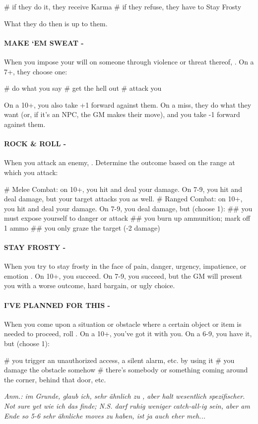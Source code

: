 \begin{easylist}
    # if they do it, they receive Karma
    # if they refuse, they have to Stay Frosty 
\end{easylist}

What they do then is up to them.


\paragraph{MAKE ‘EM SWEAT -} When you impose your will on someone through violence or threat thereof, . On a 7+, they choose one:

\begin{easylist}
    # do what you say
    # get the hell out
    # attack you
\end{easylist}

On a 10+, you also take +1 forward against them. On a miss, they do what they want (or, if it’s an NPC, the GM makes their move), and you take -1 forward against them.


\paragraph{ROCK \& ROLL -} When you attack an enemy, . Determine the outcome based on the range at which you attack:

\begin{easylist}
    # Melee Combat: on 10+, you hit and deal your damage. On 7-9, you hit and deal damage, but your target attacks you as well.
    # Ranged Combat: on 10+, you hit and deal your damage. On 7-9, you deal damage, but (choose 1):
    ## you must expose yourself to danger or attack
    ## you burn up ammunition; mark off 1 ammo
    ## you only graze the target (-2 damage)
\end{easylist}


\paragraph{STAY FROSTY -} When you try to stay frosty in the face of pain, danger, urgency, impatience, or emotion . On 10+, you succeed. On 7-9, you succeed, but the GM will present you with a worse outcome, hard bargain, or ugly choice.


\paragraph{I'VE PLANNED FOR THIS - } When you come upon a situation or obstacle where a certain object or item is needed to proceed, roll . On a 10+, you've got it with you. On a 6-9, you have it, but (choose 1):
\begin{easylist}
    # you trigger an unauthorized access, a silent alarm, etc. by using it
    # you damage the obstacle somehow
    # there's somebody or something coming around the corner, behind that door, etc.
\end{easylist}
\textit{Anm.: im Grunde, glaub ich, sehr ähnlich zu , aber halt wesentlich spezifischer. Not sure yet wie ich das finde; N.S. darf ruhig weniger catch-all-ig sein, aber am Ende so 5-6 sehr ähnliche moves zu haben, ist ja auch eher meh...}


